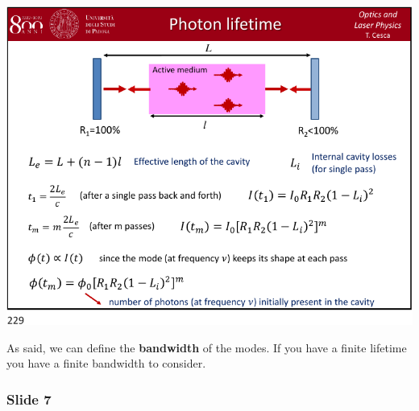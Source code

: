 \documentclass[../main/main.tex]{subfiles}
\begin{document}
\begin{minipage}[]{0.5\linewidth}
\centering
\includegraphics[page=6,width=1\textwidth]{../lessons/pdf_file/12_lecture.pdf}
\end{minipage}
\hspace{0.3cm}\vspace{0.3cm}
\begin{minipage}[c]{0.47\linewidth}

As said, we can define the \textbf{bandwidth} of the modes. If you have a finite lifetime you have a finite bandwidth to consider.

\end{minipage}

\newpage

\subsubsection*{Slide 7}
\end{document}
